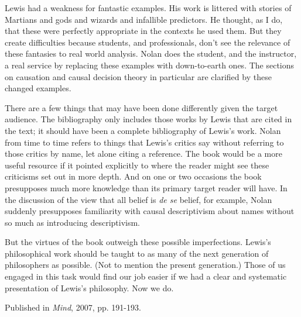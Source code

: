 \documentclass[
  11pt,
  letterpaper,
  DIV=11,
  numbers=noendperiod,
  twoside]{scrartcl}
\begin{document}
Lewis had a weakness for fantastic examples. His work is littered with
stories of Martians and gods and wizards and infallible predictors. He
thought, as I do, that these were perfectly appropriate in the contexts
he used them. But they create difficulties because students, and
professionals, don't see the relevance of these fantasies to real world
analysis. Nolan does the student, and the instructor, a real service by
replacing these examples with down-to-earth ones. The sections on
causation and causal decision theory in particular are clarified by
these changed examples.

There are a few things that may have been done differently given the
target audience. The bibliography only includes those works by Lewis
that are cited in the text; it should have been a complete bibliography
of Lewis's work. Nolan from time to time refers to things that Lewis's
critics say without referring to those critics by name, let alone citing
a reference. The book would be a more useful resource if it pointed
explicitly to where the reader might see these criticisms set out in
more depth. And on one or two occasions the book presupposes much more
knowledge than its primary target reader will have. In the discussion of
the view that all belief is \emph{de se} belief, for example, Nolan
suddenly presupposes familiarity with causal descriptivism about names
without so much as introducing descriptivism.

But the virtues of the book outweigh these possible imperfections.
Lewis's philosophical work should be taught to as many of the next
generation of philosophers as possible. (Not to mention the present
generation.) Those of us engaged in this task would find our job easier
if we had a clear and systematic presentation of Lewis's philosophy. Now
we do.

\vspace{1cm}



\noindent Published in\emph{
Mind}, 2007, pp. 191-193.
\end{document}
